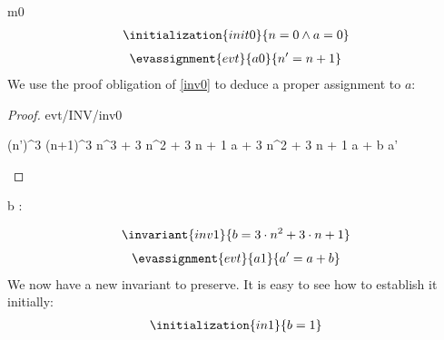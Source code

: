 \documentclass[12pt]{amsart}
\begin{document}
\begin{machine}{m0}
%
\begin{align*}
\initialization{init0}
{	n = 0 \land a = 0	}
\end{align*}
\begin{align*}
\evassignment{evt}{a0}
{	n' = n + 1	}
\end{align*}
%
We use the proof obligation of \ref{inv0} to deduce a proper assignment to $a$:
%
\begin{proof}{evt/INV/inv0}
	\begin{calculation}
		(n')^3
	\hint{=}{ \ref{a0} }
		(n+1)^3
		n^3 + 3 \cdot n^2 + 3 \cdot n + 1
	\hint{=}{ \ref{inv0} }
		a + 3 \cdot n^2 + 3 \cdot n + 1
		a + b
	\hint{=}{ \ref{a1} }
		a'
	\end{calculation}
\end{proof}
%
\begin{variable}
	b : \Int
\end{variable}
%
\begin{align*}
\invariant{inv1}
{	b = 3 \cdot n^2 + 3 \cdot n + 1	}
\end{align*}
\begin{align*}
\evassignment{evt}{a1}
{	a' = a + b	}
\end{align*}
%
We now have a new invariant to preserve. It is easy to see how to establish it initially:
\begin{align*}
\initialization{in1}
{	b = 1	}
\end{align*}
%
%
%	
%

\end{machine}
\end{document}
